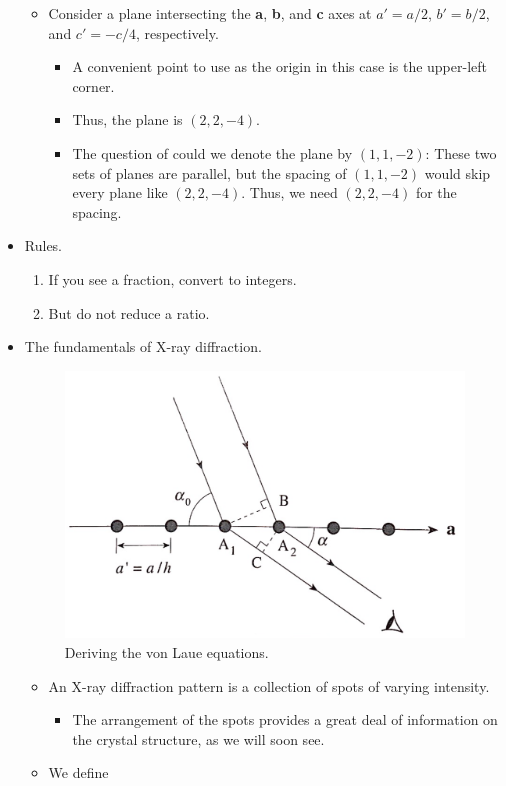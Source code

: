 \documentclass[../notes.tex]{subfiles}
\begin{document}
\begin{itemize}
\begin{itemize}
\begin{itemize}
        \end{itemize}
        \item Consider a plane intersecting the \textbf{a}, \textbf{b}, and \textbf{c} axes at $a'=a/2$, $b'=b/2$, and $c'=-c/4$, respectively.
        \begin{itemize}
            \item A convenient point to use as the origin in this case is the upper-left corner.
            \item Thus, the plane is $(2,2,-4)$.
            \item The question of could we denote the plane by $(1,1,-2)$: These two sets of planes are parallel, but the spacing of $(1,1,-2)$ would skip every plane like $(2,2,-4)$. Thus, we need $(2,2,-4)$ for the spacing.
        \end{itemize}
    \end{itemize}
    \item Rules.
    \begin{enumerate}
        \item If you see a fraction, convert to integers.
        \item But do not reduce a ratio.
    \end{enumerate}
    \item The fundamentals of X-ray diffraction.
    \begin{figure}[H]
        \centering
        \includegraphics[width=0.45\linewidth]{../ExtFiles/vonLaueDerivation.png}
        \caption{Deriving the von Laue equations.}
        \label{fig:vonLaueDerivation}
    \end{figure}
    \begin{itemize}
        \item An X-ray diffraction pattern is a collection of spots of varying intensity.
        \begin{itemize}
            \item The arrangement of the spots provides a great deal of information on the crystal structure, as we will soon see.
        \end{itemize}
        \item We define

\end{itemize}
\end{itemize}
\end{document}
